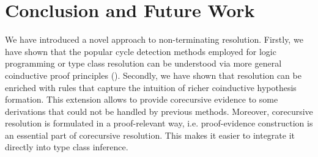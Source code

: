 \documentclass{llncs}
\begin{document}
\section{Conclusion and Future Work}\label{fwork}

We have introduced a novel approach to  non-terminating resolution.
Firstly, we have shown that the popular cycle detection methods employed for logic programming or type class resolution
can be understood via more general coinductive proof principles (\cite{coquand1994infinite,gimenez1996}).
Secondly, we have shown that 
 resolution can be enriched with rules that capture the intuition of richer coinductive hypothesis formation.
 This extension allows to provide corecursive evidence to some derivations that could not be handled by previous methods.
 Moreover, corecursive resolution is formulated in a proof-relevant way, i.e. proof-evidence construction is an essential part
 of  corecursive resolution. This makes it easier to integrate it directly into type class inference.



\begin{comment}


To obtain corecursive evidence for a query that has non-terminating resolution,
our approach is to first generate a richer coinductive hypothesis in the form of
an invariant formula, and to prove this formula automatically by corecursive
resolution, then use the proven invariant formula as a lemma to facilitate the construction
of finite evidence for the initial query. 

We first describe a heuristic method to generate invariant formulas in Section
\ref{inv}. This method exploits Paterson's condition and anti-unification. It
is essentially a form of loop detection for the resolution trace generated by
the ground query. The head of the invariant formula generated by our method is
least general due to the use of anti-unification. This is a desirable property
in practice since it avoids unnecessary overlap with other axioms. 
To construct corecursive evidence for the invariant formulas, in Section 
\ref{corec}, we extend resolution to allow corecursion and Horn formula queries. The corecursive resolution has 
  a direct type-theoretic interpretation and the corecursive evidence it generates is weak-head
  normalizing.\footnote{See Appendix \ref{ap:guard}.} In 
Section \ref{ob-equiv}, divergent resolution due to simple loops is shown to be
observational equivalent to the infinite unfolding of its corecursive evidence.

\end{comment}
\end{document}
